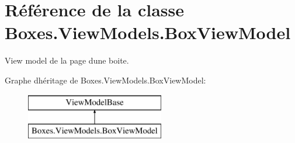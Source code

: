 \hypertarget{class_boxes_1_1_view_models_1_1_box_view_model}{}\section{Référence de la classe Boxes.\+View\+Models.\+Box\+View\+Model}
\label{class_boxes_1_1_view_models_1_1_box_view_model}


View model de la page d\textquotesingle{}une boite.  


Graphe d\textquotesingle{}héritage de Boxes.\+View\+Models.\+Box\+View\+Model\+:\begin{figure}[H]
\begin{center}
\leavevmode
\includegraphics[height=2.000000cm]{class_boxes_1_1_view_models_1_1_box_view_model}
\end{center}
\end{figure}
